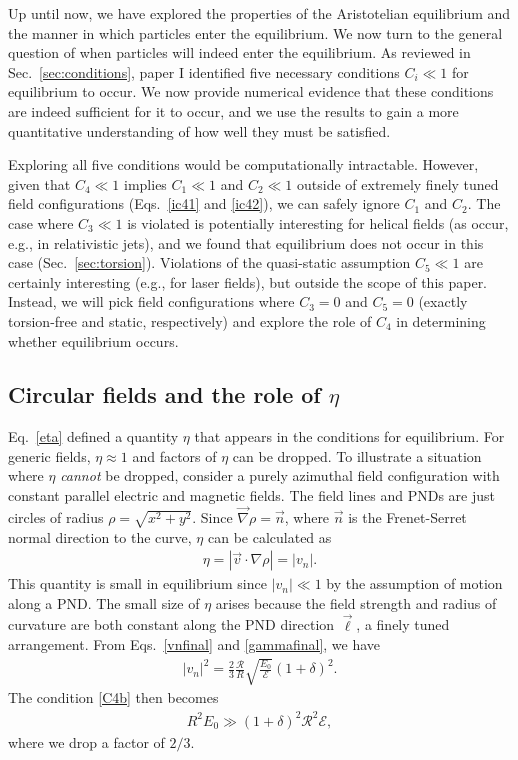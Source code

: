 \documentclass[amsmath,amssymb,nofootinbib,notitlepage,superscriptaddress,twocolumn]{revtex4-2}
\begin{document}
Up until now, we have explored the properties of the Aristotelian equilibrium and the manner in which particles enter the equilibrium.  We now turn to the general question of when particles will indeed enter the equilibrium.  As reviewed in Sec.~\ref{sec:conditions}, paper I identified five necessary conditions $C_i \ll 1$ for equilibrium to occur.  We now provide numerical evidence that these conditions are indeed sufficient for it to occur, and we use the results to gain a more quantitative understanding of how well they must be satisfied.

Exploring all five conditions would be computationally intractable.  However, given that $C_4 \ll 1$ implies $C_1 \ll 1$ and $C_2 \ll 1$ outside of extremely finely tuned field configurations (Eqs.~\eqref{ic41} and \eqref{ic42}), we can safely ignore $C_1$ and $C_2$.  The case where $C_3 \ll 1$ is violated is potentially interesting for helical fields (as occur, e.g., in relativistic jets), and we found that equilibrium does not occur in this case (Sec.~\ref{sec:torsion}).  Violations of the quasi-static assumption $C_5 \ll 1$ are certainly interesting (e.g., for laser fields), but outside the scope of this paper.  Instead, we will pick field configurations where $C_3=0$ and $C_5=0$ (exactly torsion-free and static, respectively) and explore the role of $C_4$ in determining whether equilibrium occurs.

\subsection{Circular fields and the role of $\eta$}\label{sec:circular}

Eq.~\eqref{eta} defined a quantity $\eta$ that appears in the conditions for equilibrium.  For generic fields, $\eta \approx 1$ and factors of $\eta$ can be dropped.  To illustrate a situation where $\eta$ \textit{cannot} be dropped, consider a purely azimuthal field configuration with constant parallel electric and magnetic fields.  The field lines and PNDs are just circles of radius $\rho=\sqrt{x^2+y^2}$.  Since $\vec{\nabla}\rho=\vec{n}$, where $\vec{n}$ is the Frenet-Serret normal direction to the curve, $\eta$ can be calculated as
\begin{align}\label{eta4_circular}
    \eta = |\Vec{v} \cdot \nabla \rho|= |v_n|.
\end{align}
This quantity is small in equilibrium since $|v_n| \ll 1$ by the assumption of motion along a PND.  The small size of $\eta$ arises because the field strength and radius of curvature are both constant along the PND direction $\vec{\ell}$, a finely tuned arrangement.  From Eqs.~\eqref{vnfinal} and \eqref{gammafinal}, we have
\begin{align}
    |v_n|^2=\frac{2}{3}\frac{\mathcal{R}}{R}\sqrt{\frac{E_0}{\mathcal{E}}}(1+\delta)^2.
\end{align}
The condition \eqref{C4b} then becomes 
\begin{align}\label{circular_validity}
    R^2 E_0 \gg (1+\delta)^2 \mathcal{R}^2\mathcal{E},
\end{align}
where we drop a factor of $2/3$. 
\end{document}
